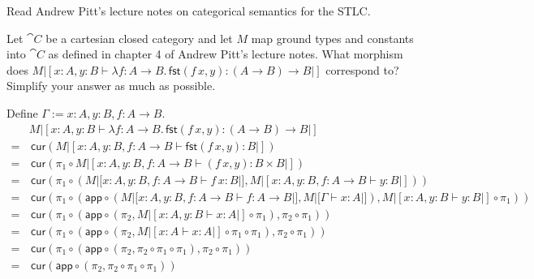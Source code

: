 \def\pathToRoot{../../}

\usepackage{semantic}
\usepackage{todonotes}




\author{Joachim Bard}

\begin{hint}
    Read Andrew Pitt's lecture notes on categorical semantics for the STLC.
\end{hint}

\begin{exercise}
    Let $\cat{C}$ be a cartesian closed category and let $M$ map ground types and constants into $\cat{C}$ as defined in chapter 4 of Andrew Pitt's lecture notes.
    What morphism does $M |[x: A, y: B \vdash \lambda f: A \to B.\,\mathsf{fst}(f\,x, y) : (A \to B) \to B|]$ correspond to?
    Simplify your answer as much as possible.
\end{exercise}
\begin{answer}
    Define $\Gamma := x: A, y: B, f: A \to B$.
    \begin{align*}
          & M |[x: A, y: B \vdash \lambda f: A \to B.\,\mathsf{fst}(f\,x, y) : (A \to B) \to B|]\\
        = &\, \mathsf{cur}(M |[x: A, y: B,f: A \to B \vdash \mathsf{fst}(f\,x, y) : B|])\\
        = &\,\mathsf{cur}(\pi_1 \circ M|[x: A, y: B, f: A \to B \vdash (f\,x, y) : B \times B|])\\
        = &\, \mathsf{cur}(\pi_1 \circ (M|[x: A, y: B,f: A \to B \vdash f\,x : B|], M|[x: A, y: B,f: A \to B \vdash y: B|]))\\
        = &\, \mathsf{cur}(\pi_1 \circ (\mathsf{app} \circ (M|[x: A, y: B,f: A \to B \vdash f : A \to B|], M|[\Gamma \vdash x: A|]), M|[x: A, y: B \vdash y: B|] \circ \pi_1))\\
        = &\, \mathsf{cur}(\pi_1 \circ (\mathsf{app} \circ (\pi_2, M|[x:A, y:B \vdash x:A|] \circ \pi_1), \pi_2 \circ \pi_1))\\
        = &\, \mathsf{cur}(\pi_1 \circ (\mathsf{app} \circ (\pi_2, M|[x:A \vdash x:A|] \circ \pi_1 \circ \pi_1), \pi_2 \circ \pi_1))\\
        = &\, \mathsf{cur}(\pi_1 \circ (\mathsf{app} \circ (\pi_2, \pi_2 \circ \pi_1 \circ \pi_1), \pi_2 \circ \pi_1))\\
        = &\, \mathsf{cur}(\mathsf{app} \circ (\pi_2, \pi_2 \circ \pi_1 \circ \pi_1))
    \end{align*}
\end{answer}

